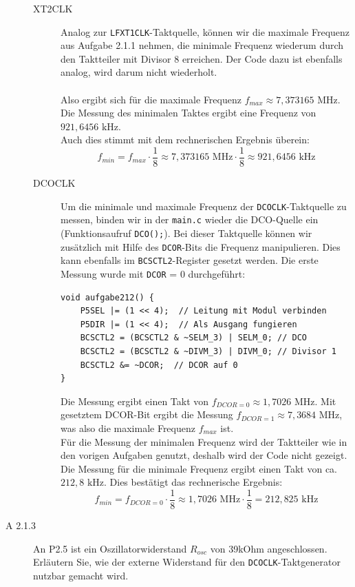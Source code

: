\documentclass[11pt,a4paper,ngerman]{article}
\begin{document}
\begin{description}
\begin{description}
			\item[XT2CLK] Analog zur \texttt{LFXT1CLK}-Taktquelle, können wir die maximale Frequenz aus Aufgabe 2.1.1 nehmen, die minimale Frequenz wiederum durch den Taktteiler mit Divisor 8 erreichen. Der Code dazu ist ebenfalls analog, wird darum nicht wiederholt. \\ \\
			Also ergibt sich für die maximale Frequenz $f_{max} \approx 7,373165 \text{ MHz}$. \\
			Die Messung des minimalen Taktes ergibt eine Frequenz von $921,6456 \text{ kHz}$. \\
			Auch dies stimmt mit dem rechnerischen Ergebnis überein:
			$$ f_{min} = f_{max} \cdot \frac{1}{8} \approx 7,373165 \text{ MHz} \cdot \frac{1}{8} \approx 921,6456 \text{ kHz}$$
			\item[DCOCLK] Um die minimale und maximale Frequenz der \texttt{DCOCLK}-Taktquelle zu messen, binden wir in der \texttt{main.c} wieder die DCO-Quelle ein (Funktionsaufruf \texttt{DCO();}). Bei dieser Taktquelle können wir zusätzlich mit Hilfe des \texttt{DCOR}-Bits die Frequenz manipulieren. Dies kann ebenfalls im \texttt{BCSCTL2}-Register gesetzt werden. Die erste Messung wurde mit \texttt{DCOR} = 0 durchgeführt:
			\begin{lstlisting}
void aufgabe212() {
    P5SEL |= (1 << 4);	// Leitung mit Modul verbinden
    P5DIR |= (1 << 4);	// Als Ausgang fungieren
    BCSCTL2 = (BCSCTL2 & ~SELM_3) | SELM_0; // DCO
    BCSCTL2 = (BCSCTL2 & ~DIVM_3) | DIVM_0; // Divisor 1
    BCSCTL2 &= ~DCOR;  // DCOR auf 0
}
\end{lstlisting}
			Die Messung ergibt einen Takt von $ f_{DCOR = 0} \approx 1,7026 \text{ MHz} $.
			Mit gesetztem DCOR-Bit ergibt die Messung $ f_{DCOR = 1} \approx 7,3684 \text{ MHz} $, was also die maximale Frequenz $f_{max}$ ist. \\
			Für die Messung der minimalen Frequenz wird der Taktteiler wie in den vorigen Aufgaben genutzt, deshalb wird der Code nicht gezeigt. Die Messung für die minimale Frequenz ergibt einen Takt von ca. $212,8 \text{ kHz}$. Dies bestätigt das rechnerische Ergebnis:
			$$ f_{min} = f_{DCOR = 0} \cdot \frac{1}{8} \approx 1,7026 \text{ MHz} \cdot \frac{1}{8} = 212,825 \text{ kHz} $$
		\end{description}
		
	\item[A 2.1.3] An P2.5 ist ein Oszillatorwiderstand $R_{osc}$ von 39kOhm angeschlossen. Erläutern Sie, wie der externe Widerstand für den \texttt{DCOCLK}-Taktgenerator nutzbar gemacht wird. \\
		

\end{description}
\end{document}
